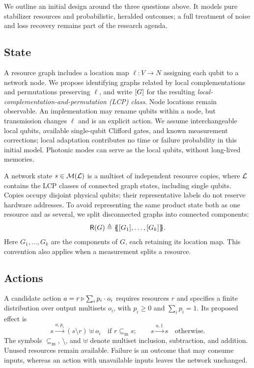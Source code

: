
We outline an initial design around the three questions above. It models pure stabilizer resources and probabilistic, heralded outcomes; a full treatment of noise and loss recovery remains part of the research agenda.

\subsection{State}
\label{sec:state}

A resource graph includes a location map $\ell:V\to N$ assigning each qubit to a network node. We propose identifying graphs related by local complementations and permutations preserving $\ell$, and write $[G]$ for the resulting \emph{local-complementation-and-permutation (LCP) class}. Node locations remain observable. An implementation may rename qubits within a node, but transmission changes $\ell$ and is an explicit action. We assume interchangeable local qubits, available single-qubit Clifford gates, and known measurement corrections; local adaptation contributes no time or failure probability in this initial model. Photonic modes can serve as the local qubits, without long-lived memories.

A network state $s\in\mathcal{M}(\mathcal{L})$ is a multiset of independent resource copies, where $\mathcal{L}$ contains the LCP classes of connected graph states, including single qubits. Copies occupy disjoint physical qubits; their representative labels do not reserve hardware addresses. To avoid representing the same product state both as one resource and as several, we split disconnected graphs into connected components:
\[
\mathsf{R}(G)\triangleq
\{\!\!\{[G_1],\ldots,[G_k]\}\!\!\}.
\]
Here $G_1,\ldots,G_k$ are the components of $G$, each retaining its location map. This convention also applies when a measurement splits a resource.

\subsection{Actions}
\label{sec:actions}

A candidate action $a=r \triangleright \sum_i p_i\cdot o_i$ requires resources $r$ and specifies a finite distribution over output multisets $o_i$, with $p_i\geq0$ and $\sum_i p_i=1$. Its proposed effect is
\[
s\xrightarrow{a,p_i}(s\setminus r)\uplus o_i
\quad\text{if }r\subseteq_{\mathrm m}s;
\qquad
s\xrightarrow{a,1}s
\quad\text{otherwise}.
\]
The symbols $\subseteq_{\mathrm m}$, $\setminus$, and $\uplus$ denote multiset inclusion, subtraction, and addition. Unused resources remain available. Failure is an outcome that may consume inputs, whereas an action with unavailable inputs leaves the network unchanged.

